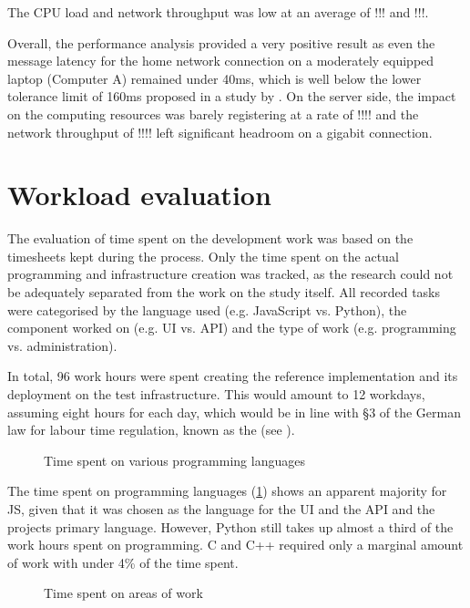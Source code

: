 The \ac{CPU} load and network throughput was low at an average of !!! and !!!.

Overall, the performance analysis provided a very positive result as even the message latency for the home network connection on a moderately equipped laptop (Computer A) remained under 40ms, which is well below the lower tolerance limit of 160ms proposed in a study by \cite{audioLatency}.
On the server side, the impact on the computing resources was barely registering at a rate of !!!! and the network throughput of !!!! left significant headroom on a gigabit connection.

\section{Workload evaluation}

The evaluation of time spent on the development work was based on the timesheets kept during the process. Only the time spent on the actual programming and infrastructure creation was tracked, as the research could not be adequately separated from the work on the study itself.
All recorded tasks were categorised by the language used (e.g. JavaScript vs. Python), the component worked on (e.g. \ac{UI} vs. \ac{API}) and the type of work (e.g. programming vs. administration).

In total, 96 work hours were spent creating the reference implementation and its deployment on the test infrastructure. This would amount to 12 workdays, assuming eight hours for each day, which would be in line with §3 of the German law for labour time regulation, known as the  (see \parencite{abzgPar3}).

\begin{figure}[h]
\centering

\caption[Time spent on languages]{Time spent on various programming languages\protect}
\label{fig:timeSpentLanguages}
\end{figure}

The time spent on programming languages (\ref{fig:timeSpentLanguages}) shows an apparent majority for \ac{JS}, given that it was chosen as the language for the \ac{UI} and the \ac{API} and the project\textquotesingle s primary language.
However, Python still takes up almost a third of the work hours spent on programming.
C and C++ required only a marginal amount of work with under 4\% of the time spent.

\begin{figure}[h]
\centering

\caption[Time spent on areas of work]{Time spent on areas of work\protect}
\label{fig:timeSpentTypeOfWork}
\end{figure}


